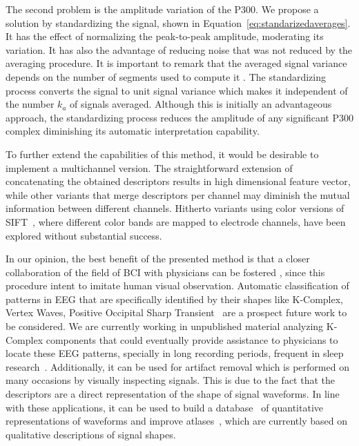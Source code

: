 \documentclass[utf8]{frontiersSCNS} %
\begin{document}
The second problem is the amplitude variation of the P300. We propose a solution by standardizing the signal, shown in Equation~\ref{eq:standarizedaverages}. It has the effect of normalizing the peak-to-peak amplitude, moderating its variation. It has also the advantage of reducing noise that was not reduced by the averaging procedure.   It is important to remark that the averaged signal variance depends on the number of segments used to compute it \citep{van2006signal}.  The standardizing process converts the signal to unit signal variance which makes it independent of the number $k_a$ of signals averaged.   Although this is initially an advantageous approach, the standardizing process reduces the amplitude of any significant P300 complex diminishing its automatic interpretation capability.

To further extend the capabilities of this method, it would be desirable to implement a multichannel version. The straightforward extension of concatenating the obtained descriptors results in high dimensional feature vector, while other variants that merge descriptors per channel may diminish the mutual information between different channels.  Hitherto variants using color versions of SIFT~\citep{VanDeSande2010}, where different color bands are mapped to electrode channels, have been explored without substantial success.

In our opinion, the best benefit of the presented method is that a closer collaboration of the field of BCI with physicians can be fostered \citep{Chavarriaga2017}, since this procedure intent to imitate human visual observation.  Automatic classification of patterns in EEG that are specifically identified by their shapes like K-Complex, Vertex Waves, Positive Occipital Sharp Transient~\citep{Hartman2005} are a prospect future work to be considered. We are currently working in unpublished material analyzing K-Complex components that could eventually provide  assistance to physicians to locate these EEG patterns, specially in long recording periods, frequent in sleep research~\citep{Michel2012}.  
Additionally, it can be used for artifact removal which is performed on many occasions by visually inspecting signals.  This is due to the fact that the descriptors are a direct representation of the shape of signal waveforms. In line with these applications,  it can be used to build a database~\citep{Chavarriaga2017} of quantitative representations of waveforms and improve atlases~\citep{Hartman2005}, which are currently based on qualitative descriptions of signal shapes.
\end{document}
